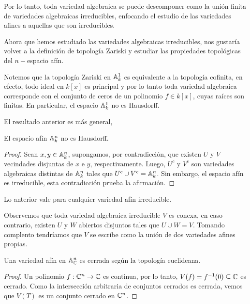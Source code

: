 \documentclass[11pt]{article}
\begin{document}
\noindent Por lo tanto, toda variedad algebraica se puede descomponer como la unión finita de
variedades algebraicas irreducibles, enfocando el estudio de las variedades afines a aquellas que
son irreducibles.

\vspace{5mm}
\noindent Ahora que hemos estudiado las variedades algebraicas irreducibles, nos gustaría volver a
la definición de topología Zariski y estudiar las propiedades topológicas del $n-$espacio afín.

\vspace{1mm}
\noindent Notemos que la topología Zariski en $\mathbb{A}_{k}^{1}$ es equivalente a la topología cofinita,
en efecto, todo ideal en $k[x]$ es principal y por lo tanto toda variedad algebraica corresponde
con el conjunto de ceros de un polinomio $f\in k[x]$, cuyas raíces son finitas. En particular, el
espacio $\mathbb{A}_{k}^{1}$ no es Hausdorff.

\vspace{1mm}
\noindent El resultado anterior es más general,

\begin{prop}
    El espacio afín $\mathbb{A}_{k}^{n}$ no es Hausdorff.
\end{prop}

\begin{proof}
    Sean $x,y\in\mathbb{A}_{k}^{n}$, supongamos, por contradicción, que existen $U$ y $V$ vecindades 
    disjuntas de $x$ e $y$, respectivamente. Luego, $U^{c}$ y $V^{c}$ son variedades algebraicas
    distintas de $\mathbb{A}_{k}^{n}$ tales que $U^{c}\cup V^{c}=\mathbb{A}_{k}^{n}$. Sin embargo, el espacio afín
    es irreducible, esta contradicción prueba la afirmación.
\end{proof}

\obs Lo anterior vale para cualquier variedad afín irreducible.

\vspace{1mm}
\noindent Observemos que toda variedad algebraica irreducible $V$ es conexa, en caso contrario,
existen $U$ y $W$ abiertos disjuntos tales que $U\cup W=V$. Tomando complento tendríamos que
$V$ se escribe como la unión de dos variedades afines propias.

\begin{prop}
    Una variedad afín en $\mathbb{A}_{\mathbb{C}}^{n}$ es cerrada según la topología euclideana.
\end{prop}

\begin{proof}
    Un polinomio $f:\mathbb{C}^{n}\to\mathbb{C}$ es continua, por lo tanto, $V(f)=f^{-1}(0)\subseteq\mathbb{C}$ es 
    cerrado. Como la intersección arbitraria de conjuntos cerrados es cerrada, vemos que $V(T)$
    es un conjunto cerrado en $\mathbb{C}^{n}$.
\end{proof}
\end{document}

